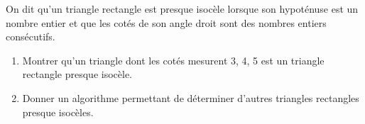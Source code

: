 
On dit qu'un triangle rectangle est presque isocèle lorsque son hypoténuse est un nombre entier et que les cotés de son angle droit sont des nombres entiers consécutifs. 
\begin{enumerate}
\item Montrer qu'un triangle dont les cotés mesurent 3, 4, 5 est un triangle rectangle presque isocèle. 
\item Donner un algorithme permettant de déterminer d'autres triangles rectangles presque isocèles.
\end{enumerate}